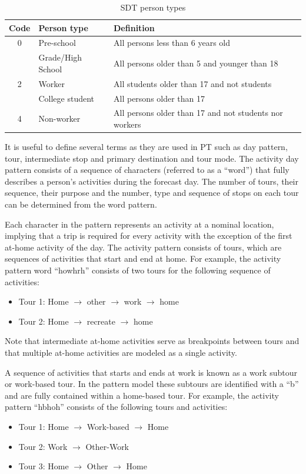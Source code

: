 \begin{table}  %
\centering
\caption{SDT person types}\label{tab:sdt-person-types}
\begin{tabular}{cll}
\hline
Code & Person type & Definition \\
\hline
0 & Pre-school & All persons less than 6 years old \\
\gray 1 & Grade/High School & All persons older than 5 and younger than 18 \\
2 & Worker & All students older than 17 and not students \\
\gray 3 & College student & All persons older than 17 \\
4 & Non-worker & All persons older than 17 and not students nor workers \\
\hline
\end{tabular}
\end{table}

It is useful to define several terms as they are used in PT such as day pattern, tour, intermediate stop and primary destination and tour mode. The activity day pattern consists of a sequence of characters (referred to as a ``word'') that fully describes a person's activities during the forecast day. The number of tours, their sequence, their purpose and the number, type and sequence of stops on each tour can be determined from the word pattern.

Each character in the pattern represents an activity at a nominal location, implying that a trip is required for every activity with the exception of the first at-home activity of the day. The activity pattern consists of tours, which are sequences of activities that start and end at home. For example, the activity pattern word ``howhrh'' consists of two tours for the following sequence of activities:
\begin{itemize}
\item Tour 1: Home $\rightarrow$ other $\rightarrow$ work $\rightarrow$ home
\item Tour 2: Home $\rightarrow$ recreate $\rightarrow$ home
\end{itemize} 

\noindent Note that intermediate at-home activities serve as breakpoints between tours and that multiple at-home activities are modeled as a single activity.

A sequence of activities that starts and ends at work is known as a work subtour or work-based tour. In the pattern model these subtours are identified with a ``b'' and are fully contained within a home-based tour. For example, the activity pattern ``hbhoh'' consists of the following tours and activities:
\begin{itemize}
\item Tour 1: Home $\rightarrow$ Work-based $\rightarrow$ Home
\item Tour 2: Work $\rightarrow$ Other-Work
\item Tour 3: Home $\rightarrow$ Other $\rightarrow$ Home
\end{itemize}

